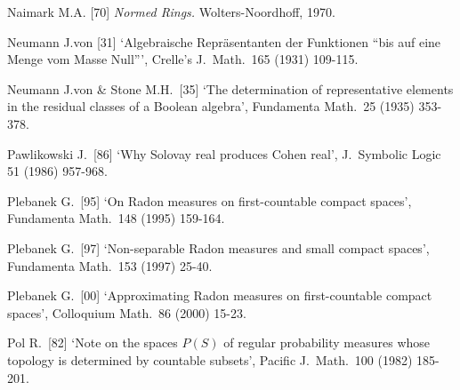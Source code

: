 {\medskip%

Naimark M.A. [70] {\it Normed Rings.}  Wolters-Noordhoff, 1970.
\cmmnt{[\S561 {\it notes\/}.]}

Neumann J.von [31] `Algebraische Repr\"asentanten der Funktionen ``bis
auf eine Menge vom Masse Null''\nobreak', Crelle's J.\ Math.\ 165 (1931)
109-115.
\cmmnt{[535G.]}

Neumann J.von \& Stone M.H.\ [35] `The determination of representative
elements in the residual classes of a Boolean algebra', Fundamenta
Math.\ 25 (1935) 353-378.
\cmmnt{[\S535 {\it notes\/}.]}



\medskip%


Pawlikowski J.\ [86] `Why Solovay real produces Cohen real',
J.\ Symbolic Logic 51 (1986) 957-968.
\cmmnt{[552G, 552H.]}





Plebanek G.\ [95] `On Radon measures on first-countable compact spaces',
Fundamenta Math.\ 148 (1995) 159-164.
\cmmnt{[531P.]}

Plebanek G.\ [97] `Non-separable Radon measures and small compact
spaces', Fundamenta Math.\ 153 (1997) 25-40.
\cmmnt{[531L-531N.]} %

Plebanek G.\ [00]
`Approximating Radon measures on first-countable compact spaces',
Colloquium Math.\ 86 (2000) 15-23.
\cmmnt{[533H, 533Yc.]}



Pol R.\ [82] `Note on the spaces $P(S)$ of regular probability measures
whose topology is determined by countable subsets', Pacific J.\ Math.\
100 (1982) 185-201.
\cmmnt{[533Ya.]}

}
